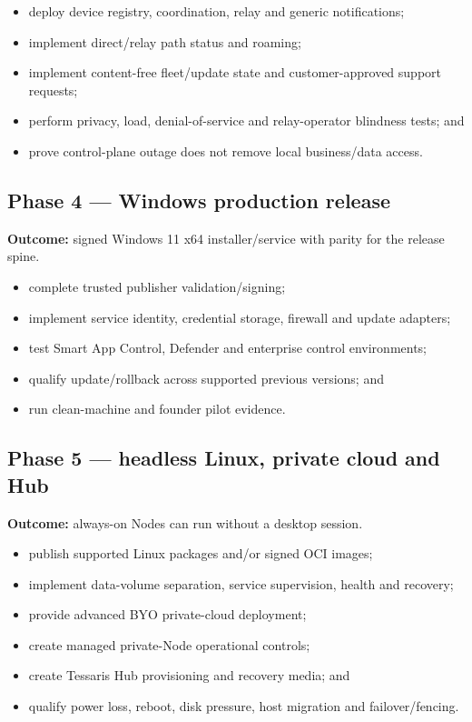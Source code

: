 \documentclass[11pt]{article}
\begin{document}
\begin{itemize}
  \item deploy device registry, coordination, relay and generic notifications;
  \item implement direct/relay path status and roaming;
  \item implement content-free fleet/update state and customer-approved support requests;
  \item perform privacy, load, denial-of-service and relay-operator blindness tests; and
  \item prove control-plane outage does not remove local business/data access.
\end{itemize}

\subsection{Phase 4 --- Windows production release}

\textbf{Outcome:} signed Windows 11 x64 installer/service with parity for the release spine.

\begin{itemize}
  \item complete trusted publisher validation/signing;
  \item implement service identity, credential storage, firewall and update adapters;
  \item test Smart App Control, Defender and enterprise control environments;
  \item qualify update/rollback across supported previous versions; and
  \item run clean-machine and founder pilot evidence.
\end{itemize}

\subsection{Phase 5 --- headless Linux, private cloud and Hub}

\textbf{Outcome:} always-on Nodes can run without a desktop session.

\begin{itemize}
  \item publish supported Linux packages and/or signed OCI images;
  \item implement data-volume separation, service supervision, health and recovery;
  \item provide advanced BYO private-cloud deployment;
  \item create managed private-Node operational controls;
  \item create Tessaris Hub provisioning and recovery media; and
  \item qualify power loss, reboot, disk pressure, host migration and failover/fencing.
\end{itemize}
\end{document}
